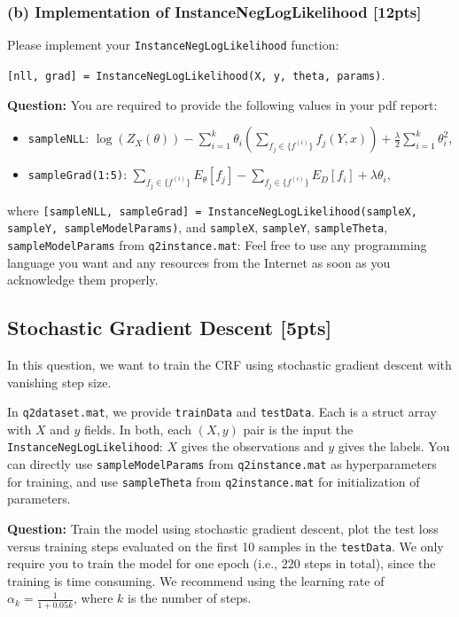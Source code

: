 

\subsubsection*{(b) Implementation of InstanceNegLogLikelihood [12pts]}

Please implement your \verb|InstanceNegLogLikelihood| function:

\verb|[nll, grad] = InstanceNegLogLikelihood(X, y, theta, params)|.

\textbf{Question:} You are required to provide the following values in your pdf report:
\begin{itemize}
\item  \verb|sampleNLL|:  $\log ( Z_X (\theta) ) - \sum_{i=1}^{k} \theta_i (  \sum_{f_j \in \{ f^{(i)} \} }  f_j (Y, x ) ) + \frac{\lambda}{2} \sum_{i = 1}^k \theta_i^2$,

\item  \verb|sampleGrad(1:5)|: $\sum_{ f_j \in \{ f^{(i)}   \}   } E_{\theta} [ f_j ] - \sum_{  f_j \in \{ f^{(i)}  \}  }  E_D [ f_i] + \lambda \theta_i$,
\end{itemize}
where
\verb|[sampleNLL, sampleGrad] = InstanceNegLogLikelihood(sampleX, sampleY, sampleModelParams)|, and \verb|sampleX|, \verb|sampleY|, \verb|sampleTheta|, \verb|sampleModelParams| from \verb|q2instance.mat|:
Feel free to use any programming language you want and any resources from the Internet as soon as you acknowledge them properly.




\subsection{Stochastic Gradient Descent [5pts]}

In this question, we want to train the CRF using stochastic gradient descent with vanishing step size.

In \verb|q2dataset.mat|, we provide \verb|trainData| and \verb|testData|. Each is a struct array with $X$ and $y$ fields. In both, each $(X, y)$ pair is the input the \verb|InstanceNegLogLikelihood|: $X$ gives the observations and $y$ gives the labels. You can directly use \verb|sampleModelParams| from \verb|q2instance.mat| as hyperparameters for training, and use \verb|sampleTheta| from \verb|q2instance.mat| for initialization of parameters.

\textbf{Question:} Train the model using stochastic gradient descent, plot the test loss versus training steps evaluated on the first 10 samples in the \verb|testData|. We only require you to train the model for one epoch (i.e., 220 steps in total), since the training is time consuming. We recommend using the learning rate of $\alpha_k = \frac{1}{1 + 0.05k}$, where $k$ is the number of steps.



